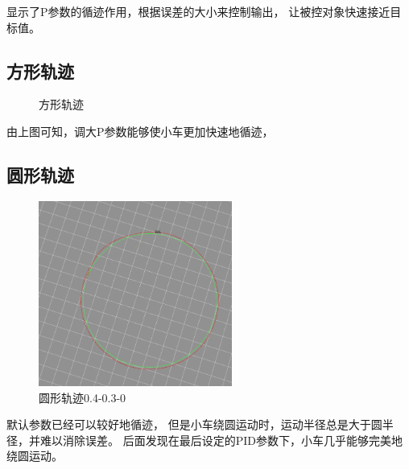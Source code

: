 \documentclass{xjtureport}
\begin{document}
显示了P参数的循迹作用，根据误差的大小来控制输出，
让被控对象快速接近目标值。

\subsection{方形轨迹}

\begin{figure}[H]
    \centering
    \caption{方形轨迹}
\end{figure}
由上图可知，调大P参数能够使小车更加快速地循迹，
\subsection{圆形轨迹}

\begin{figure}[H]
    \centering
    \includegraphics[width=2.5in]{figures/circle430.png}
    \caption{圆形轨迹0.4-0.3-0}
\end{figure}
默认参数已经可以较好地循迹，
但是小车绕圆运动时，运动半径总是大于圆半径，并难以消除误差。
后面发现在最后设定的PID参数下，小车几乎能够完美地绕圆运动。
\end{document}
